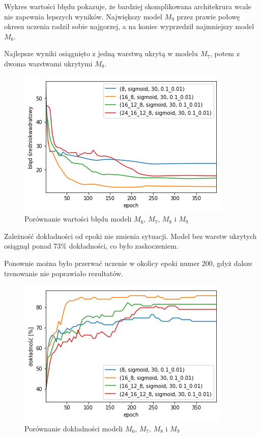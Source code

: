 \documentclass{report}
\begin{document}
    Wykres wartości błędu pokazuje, że bardziej skomplikowana architekrura wcale nie zapewnia lepszych wyników.
    Największy model $M_9$ przez prawie połowę okresu uczenia radził sobie najgorzej, a na koniec wyprzedził najmniejszy model $M_6$.

    Najlepsze wyniki osiągnięto z jedną warstwą ukrytą w modelu $M_7$, potem z dwoma warstwami ukrytymi $M_8$.

    \begin{figure}[htp]
        \centering
        \includegraphics[scale=0.8]{./img/arch-error.png}
        \caption{Porównanie wartości błędu modeli $M_6$, $M_7$, $M_8$ i $M_9$}
    \end{figure}

    Zależność dokładności od epoki nie zmienia sytuacji.
    Model bez warstw ukrytych osiągnął ponad 73\% dokładności, co było zaskoczeniem.

    Ponownie można było przerwać uczenie w okolicy epoki numer 200, gdyż dalsze trenowanie nie poprawiało rezultatów.

    \begin{figure}[htp]
        \centering
        \includegraphics[scale=0.8]{./img/arch-accuracy.png}
        \caption{Porównanie dokładności modeli $M_6$, $M_7$, $M_8$ i $M_9$}
    \end{figure}
\end{document}
